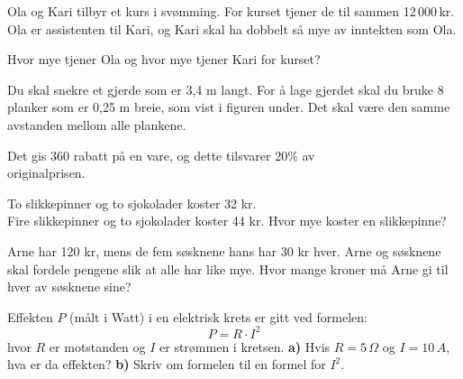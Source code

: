 




\opgt

Ola og Kari tilbyr et kurs i svømming. For kurset tjener de til sammen 12\,000\,kr. Ola er assistenten til Kari, og Kari skal ha dobbelt så mye av inntekten som Ola. \os

Hvor mye tjener Ola og hvor mye tjener Kari for kurset?

Du skal snekre et gjerde som er 3,4 m langt. For å lage gjerdet skal du bruke 8 planker som er 0,25 m breie, som vist i figuren under. Det skal være den samme avstanden mellom alle plankene. 

 \vs
{}

 \vs
{}
\newpage
{}
Det gis 360 rabatt på en vare, og dette tilsvarer 20\% av \\ originalprisen.

To slikkepinner og to sjokolader koster 32 kr.\\
Fire slikkepinner og to sjokolader koster 44 kr.\os
Hvor mye koster en slikkepinne?


\newpage


Arne har 120 kr, mens de fem søsknene hans har 30 kr hver. Arne og søsknene skal fordele pengene slik at alle har like mye. Hvor mange kroner må Arne gi til hver av søsknene sine?

Effekten $ P $ (målt i Watt) i en elektrisk krets er gitt ved formelen:
\[ P=R\cdot I^2 \]
hvor $ R $ er motstanden og $ I $ er strømmen i kretsen.\os
\textbf{a)} Hvis $ {R=5\,\Omega} $ og $ {I=10\,A} $, hva er da effekten?\os
\textbf{b)} Skriv om formelen til en formel for $ I^2 $.

